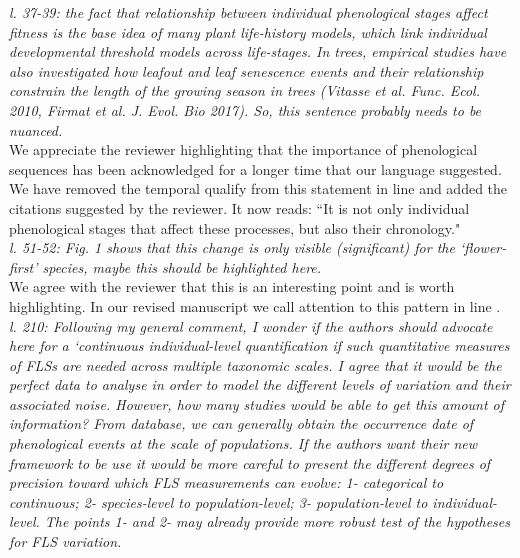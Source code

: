 \documentclass{article}[11pt]
\begin{document}
\emph{l. 37-39: the fact that relationship between individual phenological stages affect fitness is the base idea of many plant life-history models, which link individual developmental threshold models across life-stages. In trees, empirical studies have also investigated how leafout and leaf senescence events and their relationship constrain the length of the growing season in trees (Vitasse et al. Func. Ecol. 2010, Firmat et al. J. Evol. Bio 2017). So, this sentence probably needs to be nuanced.}\\

\noindent We appreciate the reviewer highlighting that the importance of phenological sequences has been acknowledged for a longer time that our language suggested. We have removed the temporal qualify from this statement in line  and added the citations suggested by the reviewer. It now reads: ``It is not only individual phenological stages that affect these processes, but also their chronology."\\

\emph{l. 51-52: Fig. 1 shows that this change is only visible (significant) for the `flower-first' species, maybe this should be highlighted here.}\\

\noident We agree with the reviewer that this is an interesting point and is worth highlighting. In our revised manuscript we call attention to this pattern in line .\\

\emph{l. 210: Following my general comment, I wonder if the authors should advocate here for a `continuous individual-level quantification if such quantitative measures of FLSs are needed across multiple taxonomic scales. I agree that it would be the perfect data to analyse in order to model the different levels of variation and their associated noise. However, how many studies would be able to get this amount of information? From database, we can generally obtain the occurrence date of phenological events at the scale of populations. If the authors want their new framework to be use it would be more careful to present the different degrees of precision toward which FLS measurements can evolve: 1- categorical to continuous; 2- species-level to population-level; 3- population-level to individual-level. The points 1- and 2- may already provide more robust test of the hypotheses for FLS variation.}\\ %
\end{document}
